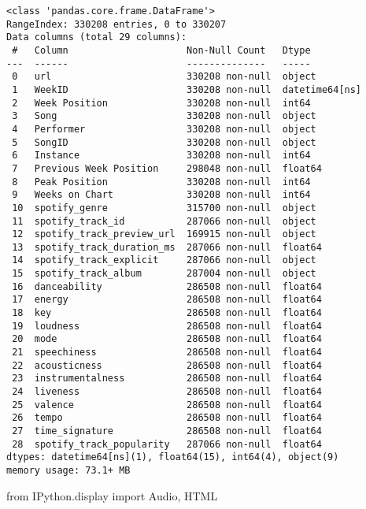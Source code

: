 \documentclass[
  a4paper,
]{scrbook}
\newenvironment{Shaded}{\begin{snugshade}}{\end{snugshade}}
\newcommand{\ImportTok}[1]{\textcolor[rgb]{0.00,0.46,0.62}{#1}}
\newcommand{\NormalTok}[1]{\textcolor[rgb]{0.00,0.23,0.31}{#1}}
\begin{document}
\begin{verbatim}
<class 'pandas.core.frame.DataFrame'>
RangeIndex: 330208 entries, 0 to 330207
Data columns (total 29 columns):
 #   Column                     Non-Null Count   Dtype         
---  ------                     --------------   -----         
 0   url                        330208 non-null  object        
 1   WeekID                     330208 non-null  datetime64[ns]
 2   Week Position              330208 non-null  int64         
 3   Song                       330208 non-null  object        
 4   Performer                  330208 non-null  object        
 5   SongID                     330208 non-null  object        
 6   Instance                   330208 non-null  int64         
 7   Previous Week Position     298048 non-null  float64       
 8   Peak Position              330208 non-null  int64         
 9   Weeks on Chart             330208 non-null  int64         
 10  spotify_genre              315700 non-null  object        
 11  spotify_track_id           287066 non-null  object        
 12  spotify_track_preview_url  169915 non-null  object        
 13  spotify_track_duration_ms  287066 non-null  float64       
 14  spotify_track_explicit     287066 non-null  object        
 15  spotify_track_album        287004 non-null  object        
 16  danceability               286508 non-null  float64       
 17  energy                     286508 non-null  float64       
 18  key                        286508 non-null  float64       
 19  loudness                   286508 non-null  float64       
 20  mode                       286508 non-null  float64       
 21  speechiness                286508 non-null  float64       
 22  acousticness               286508 non-null  float64       
 23  instrumentalness           286508 non-null  float64       
 24  liveness                   286508 non-null  float64       
 25  valence                    286508 non-null  float64       
 26  tempo                      286508 non-null  float64       
 27  time_signature             286508 non-null  float64       
 28  spotify_track_popularity   287066 non-null  float64       
dtypes: datetime64[ns](1), float64(15), int64(4), object(9)
memory usage: 73.1+ MB
\end{verbatim}

\begin{Shaded}
\begin{Highlighting}[]
\ImportTok{from}\NormalTok{ IPython.display }\ImportTok{import}\NormalTok{ Audio, HTML}
\end{Highlighting}
\end{Shaded}
\end{document}
